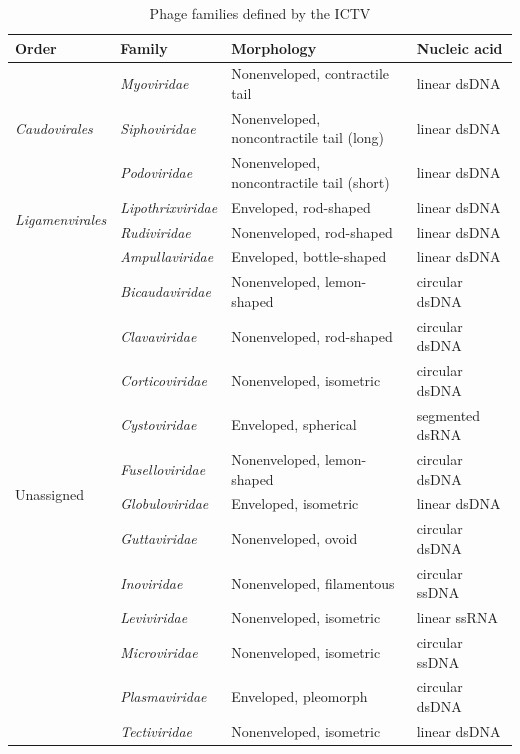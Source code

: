 \begin{table}[t]
    \caption{Phage families defined by the ICTV}
    \centering
    \scriptsize
    \begin{tabularx}{\textwidth}{lXlX}
    \toprule
    Order & Family & Morphology & Nucleic acid \\
    \midrule
    \multirow{3}{*}{\emph{Caudovirales}} & \emph{Myoviridae} & Nonenveloped, contractile tail & linear dsDNA \\
                                  & \emph{Siphoviridae} & Nonenveloped, noncontractile tail (long) & linear dsDNA \\
                                  & \emph{Podoviridae} & Nonenveloped, noncontractile tail (short) & linear dsDNA \\
    \midrule
    \multirow{2}{*}{\emph{Ligamenvirales}} & \emph{Lipothrixviridae} & Enveloped, rod-shaped & linear dsDNA \\
                                    & \emph{Rudiviridae} & Nonenveloped, rod-shaped & linear dsDNA \\
    \midrule
    \multirow{13}{*}{Unassigned} & \emph{Ampullaviridae} & Enveloped, bottle-shaped & linear dsDNA\\
                                 & \emph{Bicaudaviridae} & Nonenveloped, lemon-shaped & circular dsDNA \\
                                 & \emph{Clavaviridae}   & Nonenveloped, rod-shaped & circular dsDNA \\
                                 & \emph{Corticoviridae} & Nonenveloped, isometric & circular dsDNA \\
                                 & \emph{Cystoviridae}   & Enveloped, spherical & segmented dsRNA \\
                                 & \emph{Fuselloviridae} & Nonenveloped, lemon-shaped & circular dsDNA \\
                                 & \emph{Globuloviridae} & Enveloped, isometric & linear dsDNA \\
                                 & \emph{Guttaviridae}   & Nonenveloped, ovoid & circular dsDNA \\
                                 & \emph{Inoviridae}     & Nonenveloped, filamentous & circular ssDNA \\
                                 & \emph{Leviviridae}    & Nonenveloped, isometric & linear ssRNA \\
                                 & \emph{Microviridae}   & Nonenveloped, isometric & circular ssDNA \\
                                 & \emph{Plasmaviridae}  & Enveloped, pleomorph& circular dsDNA \\
                                 & \emph{Tectiviridae}   & Nonenveloped, isometric & linear dsDNA \\
    \bottomrule
    \end{tabularx}
    \label{phage:table:families}
\end{table}


